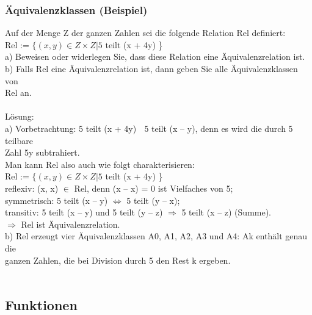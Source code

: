 \documentclass[6pt,a4paper]{scrartcl}
\begin{document}
\begin{multicols*}{2}
\subsubsection{Äquivalenzklassen (Beispiel)}
Auf der Menge Z der ganzen Zahlen sei die folgende Relation Rel definiert:\\
Rel := $\{ (x, y) \in Z \times Z | 5$ teilt (x + 4y) \}\\
a) Beweisen oder widerlegen Sie, dass diese Relation eine Äquivalenzrelation ist.\\
b) Falls Rel eine Äquivalenzrelation ist, dann geben Sie alle Äquivalenzklassen von\\
Rel an.\\
\\
Lösung:\\
a) Vorbetrachtung: 5 teilt (x + 4y)  5 teilt (x – y), denn es wird die durch 5 teilbare\\
Zahl 5y subtrahiert.\\
Man kann Rel also auch wie folgt charakterisieren:\\
Rel := $\{ (x, y) \in Z \times Z | 5$ teilt (x + 4y) \}\\
reflexiv: (x, x) $\in$ Rel, denn (x – x) = 0 ist Vielfaches von 5;\\
symmetrisch: 5 teilt (x – y) $\Leftrightarrow$ 5 teilt (y – x);\\
transitiv: 5 teilt (x – y) und 5 teilt (y – z) $\Rightarrow$ 5 teilt (x – z) (Summe).\\
$\Rightarrow$ Rel ist Äquivalenzrelation.\\
b) Rel erzeugt vier Äquivalenzklassen A0, A1, A2, A3 und A4: Ak enthält genau die\\
ganzen Zahlen, die bei Division durch 5 den Rest k ergeben.\\
\\

\subsection{Funktionen}


\end{multicols*}
\end{document}
